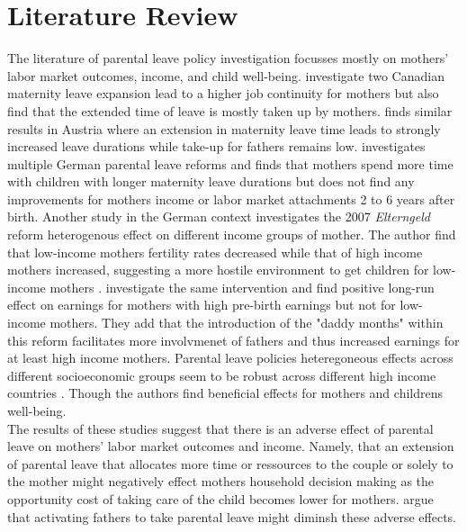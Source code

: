 \section{Literature Review}

The literature of parental leave policy investigation focusses mostly on mothers' labor market outcomes, income, and child well-being.
\citet{baker2008does} investigate two Canadian maternity leave expansion lead to a higher job continuity for mothers but also find that the
extended time of leave is mostly taken up by mothers.
\citet{laliveParentalLeaveMothers2014} finds similar results in Austria where an extension in maternity leave time leads to strongly increased leave durations
while take-up for fathers remains low.
 \citet{schonbergExpansionsMaternityLeave2014} investigates multiple German parental leave reforms and finds that mothers spend more time with children with longer
maternity leave durations but does not find any improvements for mothers income or labor market attachments 2 to 6 years after birth.
Another study in the German context investigates the 2007 \textit{Elterngeld} reform heterogenous effect on different income groups of mother. The author find that
low-income mothers fertility rates decreased while that of high income mothers increased, suggesting a more hostile environment to get children for low-income mothers
\citep{cygan-rehmParentalLeaveBenefit2016}.
\citet*{frodermannParentalLeavePolicy2023} investigate the same intervention and find positive long-run effect on earnings for mothers with high pre-birth earnings but not for low-income mothers.
They add that the introduction of the "daddy months" within this reform facilitates more involvmenet of fathers and thus increased earnings for at least
high income mothers.
Parental leave policies heteregoneous effects across different socioeconomic groups seem to be robust across different high income countries \citep{canaanMaternityLeavePaternity2022}.
Though the authors find beneficial effects for mothers and childrens well-being. \\
The results of these studies suggest that there is an adverse effect of parental leave on mothers' labor market outcomes and income. Namely,
that an extension of parental leave that allocates more time or ressources to the couple or solely to the mother might negatively effect mothers
household decision making as the opportunity cost of taking care of the child becomes lower for mothers.
\citet{canaanMaternityLeavePaternity2022} argue that activating fathers to take parental leave might diminsh these adverse effects.


